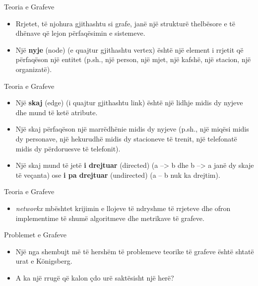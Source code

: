 \documentclass[
  ignorenonframetext,
]{beamer}
\providecommand{\tightlist}{%
  \setlength{\itemsep}{0pt}\setlength{\parskip}{0pt}}
\begin{document}
\begin{frame}{Teoria e Grafeve}
\protect\hypertarget{teoria-e-grafeve}{}
\begin{itemize}
\item
  Rrjetet, të njohura gjithashtu si grafe, janë një strukturë thelbësore
  e të dhënave që lejon përfaqësimin e sistemeve.
\item
  Një \textbf{nyje} (node) (e quajtur gjithashtu vertex) është një
  element i rrjetit që përfaqëson një entitet (p.sh., një person, një
  mjet, një kafshë, një stacion, një organizatë).
\end{itemize}
\end{frame}

\begin{frame}{Teoria e Grafeve}
\protect\hypertarget{teoria-e-grafeve-1}{}
\begin{itemize}
\item
  Një \textbf{skaj} (edge) (i quajtur gjithashtu link) është një lidhje
  midis dy nyjeve dhe mund të ketë atribute.
\item
  Një skaj përfaqëson një marrëdhënie midis dy nyjeve (p.sh., një miqësi
  midis dy personave, një hekurudhë midis dy stacioneve të trenit, një
  telefonatë midis dy përdoruesve të telefonit).
\item
  Një skaj mund të jetë \textbf{i drejtuar} (directed) (a
  --\textgreater{} b dhe b --\textgreater{} a janë dy skaje të veçanta)
  ose \textbf{i pa drejtuar} (undirected) (a -- b nuk ka drejtim).
\end{itemize}
\end{frame}

\begin{frame}{Teoria e Grafeve}
\protect\hypertarget{teoria-e-grafeve-2}{}
\begin{itemize}
\tightlist
\item
  \emph{networkx} mbështet krijimin e llojeve të ndryshme të rrjeteve
  dhe ofron implementime të shumë algoritmeve dhe metrikave të grafeve.
\end{itemize}
\end{frame}

\begin{frame}{Problemet e Grafeve}
\protect\hypertarget{problemet-e-grafeve}{}
\begin{itemize}
\item
  Një nga shembujt më të hershëm të problemeve teorike të grafeve është
  shtatë urat e Königsberg.
\item
  A ka një rrugë që kalon çdo urë saktësisht një herë?
\end{itemize}
\end{frame}
\end{document}
